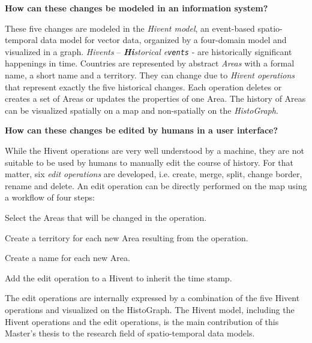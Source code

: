 \begin{description}[labelindent=0.1em]
  \item[\textbf{2a)}]
  \textbf{
    How can these changes be modeled in an information system?
  }
\end{description}

These five changes are modeled in the \emph{Hivent model}, an event-based spatio-temporal data model for vector data, organized by a four-domain model and visualized in a graph.
\emph{Hivents} -- \emph{\textbf{Hi}storical e\texttt{vents}} - are historically significant happenings in time.
Countries are represented by abstract \emph{Areas} with a formal name, a short name and a territory. They can change due to \emph{Hivent operations} that represent exactly the five historical changes. Each operation deletes or creates a set of Areas or updates the properties of one Area.
The history of Areas can be visualized spatially on a map and non-spatially on the \emph{HistoGraph}.

\begin{description}[labelindent=0.1em]
  \item[\textbf{2b)}]
  \textbf{
    How can these changes be edited by humans in a user interface?
  }
\end{description}

While the Hivent operations are very well understood by a machine, they are not suitable to be used by humans to manually edit the course of history. For that matter, six \emph{edit operations} are developed, i.e. create, merge, split, change border, rename and delete. An edit operation can be directly performed on the map using a workflow of four steps:

\begin{compactenum}
  \item Select the Areas that will be changed in the operation.
  \item Create a territory for each new Area resulting from the operation.
  \item Create a name for each new Area.
  \item Add the edit operation to a Hivent to inherit the time stamp.
\end{compactenum}

The edit operations are internally expressed by a combination of the five Hivent operations and visualized on the HistoGraph. The Hivent model, including the Hivent operations and the edit operations, is the main contribution of this Master's thesis to the research field of spatio-temporal data models.

